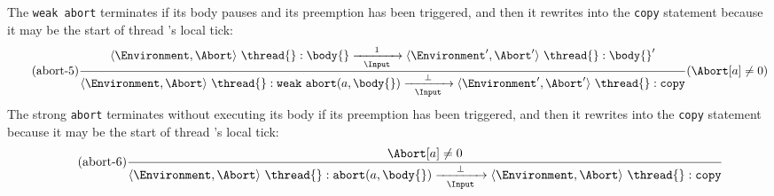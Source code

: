 The \verb$weak abort$ terminates if its body pauses and its preemption has been triggered,
and then it rewrites into the \verb$copy$ statement because it may be the start of thread \thread{}'s 
local tick\footnotemark[2]:
\begin{equation*}
	\tag{abort-5}
	\label{forec:abort-5}
	\frac{
			\langle \Environment, \Abort \rangle ~ \thread{}:\body{}
				\xrightarrow[~~\Input~~]{1} 
			\langle \Environment', \Abort' \rangle ~ \thread{}:\body{}'
		}{
			\langle \Environment, \Abort \rangle ~ \thread{}:\mathtt{weak}~\mathtt{abort}(a, \body{})
				\xrightarrow[~~\Input~~]{\bot} 
			\langle \Environment', \Abort' \rangle ~ \thread{}:\mathtt{copy}
		}
	(\Abort[a] \neq 0)
\end{equation*}
The strong \verb$abort$ terminates without executing its body if its preemption has been triggered,
and then it rewrites into the \verb$copy$ statement because it may be the start of thread \thread{}'s 
local tick\footnotemark[3]:
\begin{equation*}
	\tag{abort-6}
	\label{forec:abort-6}
	\frac{
			\Abort[a] \neq 0
		}{
			\langle \Environment, \Abort \rangle ~ \thread{}:\mathtt{abort}(a, \body{})
				\xrightarrow[~~\Input~~]{\bot} 
			\langle \Environment, \Abort \rangle ~ \thread{}:\mathtt{copy}
		}
\end{equation*}


